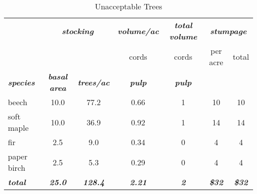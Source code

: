 \documentclass[landscape]{article}
\begin{document}
\begin{table}[H]

\caption{\label{tab:unnamed-chunk-29}Unacceptable Trees}
\fontsize{10}{12}\selectfont
\begin{tabular}[t]{lcccccc}
\toprule
\multicolumn{1}{c}{\em{\textbf{ }}} & \multicolumn{2}{c}{\em{\textbf{stocking}}} & \multicolumn{1}{c}{\em{\textbf{volume/ac }}} & \multicolumn{1}{c}{\em{\textbf{total volume}}} & \multicolumn{2}{c}{\em{\textbf{stumpage}}} \\
\cmidrule(l{3pt}r{3pt}){2-3} \cmidrule(l{3pt}r{3pt}){4-4} \cmidrule(l{3pt}r{3pt}){5-5} \cmidrule(l{3pt}r{3pt}){6-7}
\multicolumn{3}{c}{ } & \multicolumn{1}{c}{cords} & \multicolumn{1}{c}{cords} & \multicolumn{1}{c}{per acre} & \multicolumn{1}{c}{total} \\
\cmidrule(l{3pt}r{3pt}){4-4} \cmidrule(l{3pt}r{3pt}){5-5} \cmidrule(l{3pt}r{3pt}){6-6} \cmidrule(l{3pt}r{3pt}){7-7}
\rowcolor[HTML]{DCDCDC}  \em{\textbf{species}} & \em{\textbf{basal area}} & \em{\textbf{trees/ac}} & \em{\textbf{pulp}} & \em{\textbf{pulp}} & \em{\textbf{ }} & \em{\textbf{ }}\\
\midrule
\rowcolor{gray!6}  beech & 10.0 & 77.2 & 0.66 & 1 & 10 & 10\\
 
soft maple & 10.0 & 36.9 & 0.92 & 1 & 14 & 14\\
 
\rowcolor{gray!6}  fir & 2.5 & 9.0 & 0.34 & 0 & 4 & 4\\
 
paper birch & 2.5 & 5.3 & 0.29 & 0 & 4 & 4\\
 
\rowcolor{gray!6}  \rowcolor[HTML]{DCDCDC}  \em{\textbf{total}} & \em{\textbf{25.0}} & \em{\textbf{128.4}} & \em{\textbf{2.21}} & \em{\textbf{2}} & \em{\textbf{\$32}} & \em{\textbf{\$32}}\\
\bottomrule
\end{tabular}
\end{table}
\end{document}
